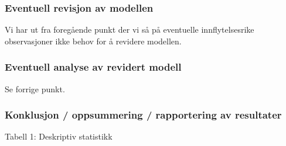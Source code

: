 \documentclass[
]{article}
\newenvironment{Shaded}{\begin{snugshade}}{\end{snugshade}}
\newcommand{\AttributeTok}[1]{\textcolor[rgb]{0.77,0.63,0.00}{#1}}
\newcommand{\CommentTok}[1]{\textcolor[rgb]{0.56,0.35,0.01}{\textit{#1}}}
\newcommand{\FunctionTok}[1]{\textcolor[rgb]{0.00,0.00,0.00}{#1}}
\newcommand{\NormalTok}[1]{#1}
\newcommand{\OtherTok}[1]{\textcolor[rgb]{0.56,0.35,0.01}{#1}}
\newcommand{\SpecialCharTok}[1]{\textcolor[rgb]{0.00,0.00,0.00}{#1}}
\newcommand{\StringTok}[1]{\textcolor[rgb]{0.31,0.60,0.02}{#1}}
\begin{document}
\hypertarget{eventuell-revisjon-av-modellen}{%
\subsubsection{Eventuell revisjon av modellen}\label{eventuell-revisjon-av-modellen}}

Vi har ut fra foregående punkt der vi så på eventuelle innflytelsesrike observasjoner ikke behov for å revidere modellen.

\hypertarget{eventuell-analyse-av-revidert-modell}{%
\subsubsection{Eventuell analyse av revidert modell}\label{eventuell-analyse-av-revidert-modell}}

Se forrige punkt.

\hypertarget{konklusjon-oppsummering-rapportering-av-resultater}{%
\subsubsection{Konklusjon / oppsummering / rapportering av resultater}\label{konklusjon-oppsummering-rapportering-av-resultater}}

Tabell 1: Deskriptiv statistikk

\begin{Shaded}
\end{Shaded}
\end{document}
